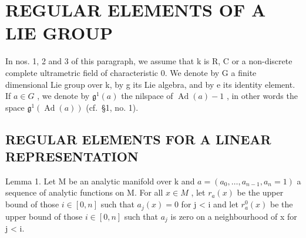 \section{REGULAR ELEMENTS OF A LIE GROUP}

In nos. 1, 2 and 3 of this paragraph, we assume that k is R, C or a non-discrete complete ultrametric field of characteristic 0. We denote by G a finite dimensional Lie group over k, by g its Lie algebra, and by e its identity element. If \(a \in G\) , we denote by \(\mathfrak{g}^{1}(a)\) the nilspace of \(\operatorname{Ad}(a) - 1\) , in other words the space \(\mathfrak{g}^{1}(\operatorname{Ad}(a))\) (cf.~§1, no. 1).

\subsection{REGULAR ELEMENTS FOR A LINEAR REPRESENTATION}

Lemma 1. Let M be an analytic manifold over k and \(a = (a_{0}, \ldots, a_{n-1}, a_{n} = 1)\) a sequence of analytic functions on M. For all \(x \in M\) , let \(r_{a}(x)\) be the upper bound of those \(i \in [0, n]\) such that \(a_{j}(x) = 0\) for j \textless{} i and let \(r_{a}^{0}(x)\) be the upper bound of those \(i \in [0, n]\) such that \(a_{j}\) is zero on a neighbourhood of x for j \textless{} i.

